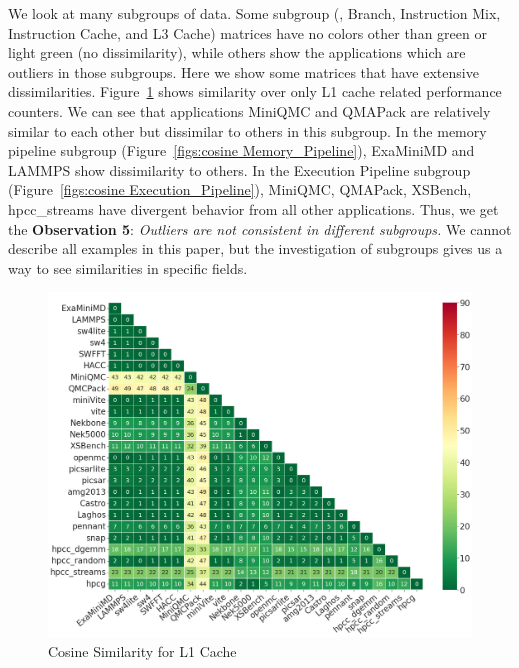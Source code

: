 We look at many subgroups of data. Some subgroup (\eg, Branch, Instruction Mix, Instruction Cache, and L3 Cache) matrices have no colors other than green or light green (no dissimilarity), while others show the applications which are outliers in those subgroups. Here we show some matrices that have extensive dissimilarities. Figure~\ref{figs:cosine L1_D_Cache} shows similarity over only L1 cache related performance counters. We can see that applications MiniQMC and QMAPack are relatively
similar to each other but dissimilar to others in this subgroup. In the memory pipeline subgroup (Figure~\ref{figs:cosine Memory_Pipeline}), ExaMiniMD and LAMMPS show dissimilarity to others. In the Execution Pipeline subgroup (Figure~\ref{figs:cosine Execution_Pipeline}), MiniQMC, QMAPack, XSBench, hpcc\_streams have divergent behavior from all other applications. Thus, we get the \textbf{Observation 5}: \textit{Outliers are not consistent in different subgroups.}
We cannot describe all examples in this paper, but the investigation of subgroups gives us a way to see similarities in specific fields.%

\begin{figure}[ht]
\centering
\includegraphics[width=0.9\linewidth]{figs/L1_Cache_font20.png}
\caption{Cosine Similarity for L1 Cache }
\label{figs:cosine L1_D_Cache}
\end{figure}


